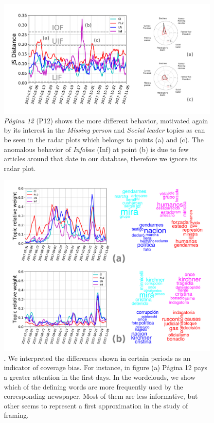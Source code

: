 \documentclass{bmcart}
\begin{document}
\begin{backmatter}
\begin{figure}[h!]
\includegraphics[width = \textwidth]{images/Fig6.pdf}
\caption{ \emph{Página 12} (P12) shows the more different behavior, motivated again by its interest in the \emph{Missing person} and \emph{Social leader} topics as can be seen in the radar plots which belongs to points (a) and (c).
The anomalous behavior of \emph{Infobae} (Inf) at point (b) is due to few articles around that date in our database, therefore we ignore its radar plot.}
\label{fig:jensen_shannon_news}
\end{figure}

\begin{figure}[h!]
\includegraphics[width = \textwidth]{images/Fig7.pdf}
\caption{. We interpreted the differences shown in certain periods as an indicator of coverage bias. For instance, in figure (a) Página 12 pays a greater attention in the first days. In the wordclouds, we show which of the defining words are more frequently used by the corresponding newspaper. Most of them are less informative, but other seems to represent a first approximation in the study of framing.}
\label{fig:topics_temporal_profiles}
\end{figure}


\end{backmatter}
\end{document}
